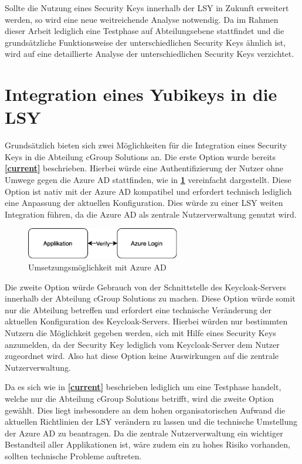 Sollte die Nutzung eines Security Keys innerhalb der \ac{LSY} in Zukunft erweitert werden, so wird eine neue weitreichende Analyse notwendig. Da im Rahmen dieser Arbeit lediglich eine Testphase auf Abteilungsebene stattfindet und die grundsätzliche Funktionsweise der unterschiedlichen Security Keys ähnlich ist, wird auf eine detaillierte Analyse der unterschiedlichen Security Keys verzichtet.

\section{Integration eines Yubikeys in die LSY}

Grundsätzlich bieten sich zwei Möglichkeiten für die Integration eines Security Keys in die Abteilung cGroup Solutions an. Die erste Option wurde bereits \textbf{\ref{current}} beschrieben. Hierbei würde eine Authentifizierung der Nutzer ohne Umwege gegen die Azure \ac{AD} stattfinden, wie in \textbf{\ref{azure-imp}} vereinfacht dargestellt. Diese Option ist nativ mit der Azure \ac{AD} kompatibel und erfordert technisch lediglich eine Anpassung der aktuellen Konfiguration. Dies würde zu einer \ac{LSY} weiten Integration führen, da die Azure \ac{AD} als zentrale Nutzerverwaltung genutzt wird.

\begin{figure}[h]
	\centering 
	\includegraphics[width=0.6\textwidth]{img/abbildungen/azure_umsetzung.png}
	\captionsetup{format=hang}
	\caption{Umsetzungsmöglichkeit mit Azure \ac{AD}} \label{azure-imp}
\end{figure}

Die zweite Option würde Gebrauch von der Schnittstelle des Keycloak-Servers innerhalb der Abteilung cGroup Solutions zu machen. Diese Option würde somit nur die Abteilung betreffen und erfordert eine technische Veränderung der aktuellen Konfiguration des Keycloak-Servers. Hierbei würden nur bestimmten Nutzern die Möglichkeit gegeben werden, sich mit Hilfe eines Security Keys anzumelden, da der Security Key lediglich vom Keycloak-Server dem Nutzer zugeordnet wird. Also hat diese Option keine Auswirkungen auf die zentrale Nutzerverwaltung. 

Da es sich wie in \textbf{\ref{current}} beschrieben lediglich um eine Testphase handelt, welche nur die Abteilung cGroup Solutions betrifft, wird die zweite Option gewählt. Dies liegt insbesondere an dem hohen organisatorischen Aufwand die aktuellen Richtlinien der \ac{LSY} verändern zu lassen und die technische Umstellung der Azure \ac{AD} zu beantragen. Da die zentrale Nutzerverwaltung ein wichtiger Bestandteil aller Applikationen ist, wäre zudem ein zu hohes Risiko vorhanden, sollten technische Probleme auftreten. 

